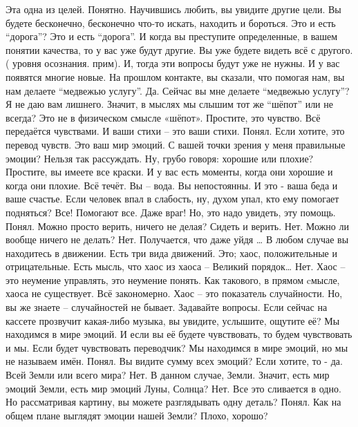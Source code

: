 \documentclass{extbook}
\newcommand{\soul}[1]{{#1}}
\newcommand{\people}[1]{{#1}}
\begin{document}
\soul{Эта одна из целей.}
\people{Понятно.}
\soul{Научившись любить, вы увидите другие цели. Вы будете бесконечно, бесконечно что-то искать, находить и бороться.}
\people{Это и есть ``дорога''?}
\soul{Это и есть ``дорога''. И когда вы преступите определенные, в вашем понятии качества, то у вас уже будут другие. Вы уже будете видеть всё с другого.  ( уровня осознания. прим).  И, тогда эти вопросы будут уже не нужны. И у вас появятся многие новые.}
\people{На прошлом контакте, вы сказали, что помогая нам, вы нам делаете ``медвежью услугу''.}
\soul{Да.}
\people{Сейчас вы мне делаете ``медвежью услугу''?}
\soul{Я не даю вам лишнего.}
\people{Значит, в мыслях мы слышим тот же ``шёпот'' или  не всегда?}
\soul{Это не в физическом смысле «шёпот». Простите, это чувство. Всё передаётся чувствами. И ваши стихи – это ваши стихи. }
\people{Понял.}
\soul{Если хотите, это перевод чувств. Это ваш мир эмоций.}
\people{С вашей точки зрения у меня правильные эмоции?}
\soul{Нельзя так рассуждать.}
\people{Ну, грубо говоря: хорошие или плохие?}
\soul{Простите, вы имеете все краски. И у  вас есть моменты, когда они хорошие и когда они плохие. Всё течёт. Вы – вода. Вы непостоянны. И это - ваша беда и ваше счастье.}
\people{Если человек впал в слабость, ну, духом упал, кто ему помогает подняться?}
\soul{Все! Помогают все. Даже враг! Но, это надо увидеть, эту помощь.}
\people{Понял. Можно просто верить, ничего не делая? Сидеть и верить.}
\soul{Нет.}
\people{Можно ли вообще ничего не делать?}
\soul{Нет.}
\people{Получается, что даже уйдя …}
\soul{В любом случае вы находитесь в движении. Есть три вида движений. Это; хаос, положительные и отрицательные.}
\people{Есть мысль, что хаос из хаоса – Великий порядок…}
\soul{Нет. Хаос – это неумение управлять, это неумение понять. Как такового, в прямом cмысле, хаоса не существует. Всё закономерно. Хаос – это показатель случайности. Но, вы же знаете – случайностей не бывает. Задавайте вопросы.}
\people{Если сейчас на кассете прозвучит какая-либо музыка, вы увидите, услышите, ощутите её?}
\soul{Мы находимся в мире эмоций. И если вы её будете чувствовать, то будем чувствовать и мы. }
\people{Если будет чувствовать переводчик?}
\soul{Мы находимся в мире эмоций, но мы не называем имён.}
\people{Понял. Вы видите сумму всех эмоций?}
\soul{Если хотите, то - да.}
\people{Всей Земли или всего мира?}
\soul{Нет. В данном случае, Земли.}
\people{Значит,  есть мир эмоций Земли, есть мир эмоций Луны, Солнца?}
\soul{ Нет. Все это сливается в одно. Но рассматривая картину, вы можете разглядывать одну деталь?}
\people{Понял. Как на общем плане выглядят эмоции нашей Земли? Плохо, хорошо?}
\end{document}
